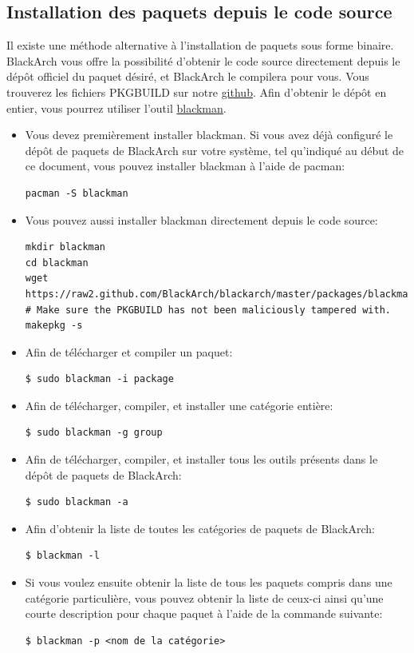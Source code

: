 \documentclass[a4paper, oneside, 11pt]{book}
\begin{document}
\subsection{Installation des paquets depuis le code source}
Il existe une méthode alternative à l'installation de paquets sous forme binaire.
BlackArch vous offre la possibilité d'obtenir le code source directement depuis le dépôt officiel du paquet désiré, et BlackArch le compilera pour vous. Vous
trouverez les fichiers PKGBUILD sur notre
\href{https://github.com/BlackArch/blackarch/tree/master/packages}{github}. Afin
d'obtenir le dépôt en entier, vous pourrez utiliser l'outil
\href{https://github.com/BlackArch/blackman}{blackman}.
\begin{itemize} \itemsep10pt
\item Vous devez premièrement installer blackman. Si vous avez déjà configuré
le dépôt de paquets de BlackArch sur votre système, tel qu'indiqué au début de
ce document, vous pouvez installer blackman à l'aide de pacman:
{\small
\color{gray}
\begin{verbatim}
pacman -S blackman
\end{verbatim}
}
\item Vous pouvez aussi installer blackman directement depuis le code source:
{\small
\color{gray}
\begin{verbatim}
mkdir blackman
cd blackman
wget https://raw2.github.com/BlackArch/blackarch/master/packages/blackman/PKGBUILD
# Make sure the PKGBUILD has not been maliciously tampered with.
makepkg -s
\end{verbatim}
}
\item Afin de télécharger et compiler un paquet:
{\small
\color{gray}
\begin{verbatim}
$ sudo blackman -i package
\end{verbatim}
}
\item Afin de télécharger, compiler, et installer une catégorie entière:
{\small
\color{gray}
\begin{verbatim}
$ sudo blackman -g group
\end{verbatim}
}
\item Afin de télécharger, compiler, et installer tous les outils présents
dans le dépôt de paquets de BlackArch:
{\small
\color{gray}
\begin{verbatim}
$ sudo blackman -a
\end{verbatim}
}
\item Afin d'obtenir la liste de toutes les catégories de paquets de BlackArch:
{\small
\color{gray}
\begin{verbatim}
$ blackman -l
\end{verbatim}
}
\item Si vous voulez ensuite obtenir la liste de tous les paquets compris dans
une catégorie particulière, vous pouvez obtenir la liste de ceux-ci ainsi qu'une
courte description pour chaque paquet à l'aide de la commande suivante:
{\small
\color{gray}
\begin{verbatim}
$ blackman -p <nom de la catégorie>
\end{verbatim}
}
\end{itemize}
\end{document}
